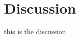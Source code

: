 \documentclass[../thesis.tex]{subfiles} %
\begin{document}
\section{Discussion}
this is the discussion
\end{document}
